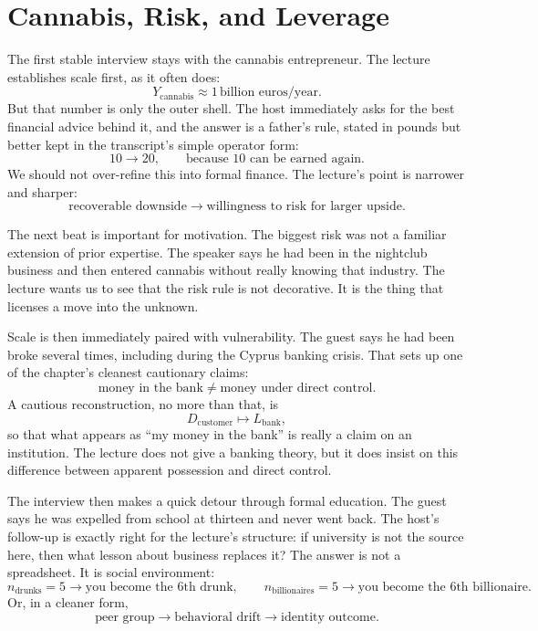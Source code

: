 \section{Cannabis, Risk, and Leverage}

The first stable interview stays with the cannabis entrepreneur. The lecture establishes scale first, as it often does:
\begin{equation}
Y_{\text{cannabis}} \approx 1\,\text{billion euros/year}.
\end{equation}
But that number is only the outer shell. The host immediately asks for the best financial advice behind it, and the answer is a father's rule, stated in pounds but better kept in the transcript's simple operator form:
\begin{equation}
10 \to 20,
\qquad
\text{because }10\text{ can be earned again.}
\end{equation}
We should not over-refine this into formal finance. The lecture's point is narrower and sharper:
\begin{equation}
\text{recoverable downside} \to \text{willingness to risk for larger upside}.
\end{equation}

The next beat is important for motivation. The biggest risk was not a familiar extension of prior expertise. The speaker says he had been in the nightclub business and then entered cannabis without really knowing that industry. The lecture wants us to see that the risk rule is not decorative. It is the thing that licenses a move into the unknown.

Scale is then immediately paired with vulnerability. The guest says he had been broke several times, including during the Cyprus banking crisis. That sets up one of the chapter's cleanest cautionary claims:
\begin{equation}
\text{money in the bank} \neq \text{money under direct control}.
\end{equation}
A cautious reconstruction, no more than that, is
\begin{equation}
D_{\text{customer}} \mapsto L_{\text{bank}},
\end{equation}
so that what appears as ``my money in the bank'' is really a claim on an institution. The lecture does not give a banking theory, but it does insist on this difference between apparent possession and direct control.

The interview then makes a quick detour through formal education. The guest says he was expelled from school at thirteen and never went back. The host's follow-up is exactly right for the lecture's structure: if university is not the source here, then what lesson about business replaces it? The answer is not a spreadsheet. It is social environment:
\begin{equation}
n_{\text{drunks}}=5 \to \text{you become the 6th drunk},
\qquad
n_{\text{billionaires}}=5 \to \text{you become the 6th billionaire}.
\end{equation}
Or, in a cleaner form,
\begin{equation}
\text{peer group} \to \text{behavioral drift} \to \text{identity outcome}.
\end{equation}

